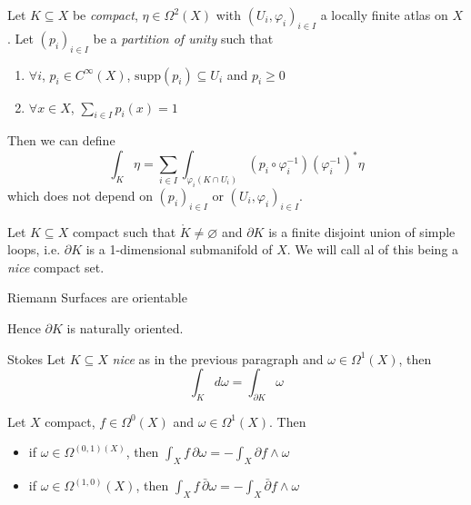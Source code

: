 Let \(K \subseteq X \) be \emph{compact}, \(\eta \in \Omega^2{(X)}\) with 
\({(U_{i}, \varphi_i)}_{i \in I} \) a locally finite atlas on \(X\). Let
\({(p_{i})}_{i \in I} \) be a \emph{partition of unity} such that
\begin{enumerate}[label = \arabic*., nosep]
    \item \(\forall i\), \(p_{i} \in C^{\infty}{(X)}\), 
        \(\mathrm{supp}{(p_{i})} \subseteq U_{i} \) and \(p_{i} \ge 0\) 
    \item \(\forall x \in X\), \(\sum_{i \in I} p _i {(x)} = 1\) 
\end{enumerate}
Then we can define
\[
  \int_K \eta = \sum_{i \in I} \int_{\varphi_i {(K \cap U_{i})}} {\left( p_{i}
  \circ \varphi_i ^{-1} \right)} {\left( \varphi_i ^{-1} \right)}^{*} \eta
\]
which does not depend on \({(p_{i})}_{i \in I} \) or \({(U_{i}, \varphi_i)}_{i
\in I}\).

Let \(K \subseteq X \) compact such that \(\mathring{K} \neq \varnothing\) and
\(\partial K\) is a finite disjoint union of simple loops, i.e. \(\partial K\)
is a 1-dimensional submanifold of \(X\). We will call al of this being a
\emph{nice} compact set.

\begin{proposition}{}
    Riemann Surfaces are orientable
\end{proposition}
Hence \(\partial K\) is naturally oriented.

\begin{theorem}{Stokes}
    Let \(K \subseteq X \) \emph{nice} as in the previous paragraph and \(\omega
    \in \Omega^{1}{(X)}\), then
    \[
      \int_K d\omega = \int _{\partial K} \omega
    \]
\end{theorem}

\begin{corollary}
    Let \(X\) compact, \(f \in \Omega^{0}{(X)}\) and \(\omega \in
    \Omega^{1}{(X)}\). Then
\begin{itemize}[label = --, nosep]
    \item if \(\displaystyle \omega \in \Omega^{{(0, 1)}{(X)}}\), then \(\displaystyle \int_X
        f \, \partial \omega = - \int _X \partial f \wedge \omega\) 
    \item if \(\displaystyle \omega \in \Omega^{{(1,0)}}{(X)}\), then
        \(\displaystyle \int_X f \, \bar{\partial} \omega  = - \int _X
        \bar{\partial} f \wedge \omega\) 
\end{itemize}
\end{corollary}

